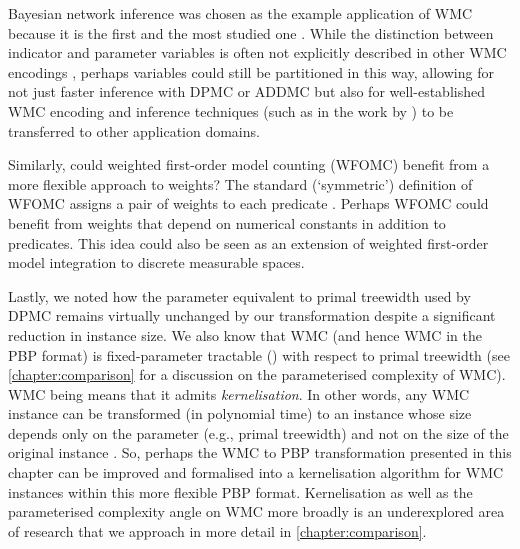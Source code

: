Bayesian network inference was chosen as the example application of WMC because
it is the first and the most studied one
\citep{DBLP:conf/ecai/BartKLM16,DBLP:conf/ijcai/ChaviraD05,DBLP:conf/sat/ChaviraD06,DBLP:conf/kr/Darwiche02,DBLP:conf/aaai/SangBK05}.
While the distinction between indicator and parameter variables is often not
explicitly described in other WMC encodings
\citep{DBLP:journals/tplp/FierensBRSGTJR15,DBLP:journals/pacmpl/HoltzenBM20,DBLP:conf/icml/XuZFLB18},
perhaps variables could still be partitioned in this way, allowing for not just
faster inference with \textsc{DPMC} or \textsc{ADDMC} but also for
well-established WMC encoding and inference techniques (such as in the work by
\citet{DBLP:conf/ijcai/ChaviraD05,DBLP:conf/sat/ChaviraD06}) to be transferred
to other application domains.

Similarly, could weighted first-order model counting (WFOMC) benefit from a more
flexible approach to weights? The standard (`symmetric') definition of WFOMC
assigns a pair of weights to each predicate
\citep{DBLP:conf/ijcai/BroeckTMDR11}. Perhaps WFOMC could benefit from weights
that depend on numerical constants in addition to predicates. This idea could
also be seen as an extension of weighted first-order model integration
\citep{DBLP:conf/uai/FeldsteinB21} to discrete measurable spaces.

Lastly, we noted how the parameter equivalent to primal treewidth used by
\textsc{DPMC} \citep{DBLP:conf/cp/DudekPV20} remains virtually unchanged by our
transformation despite a significant reduction in instance size. We also know
that WMC (and hence WMC in the PBP format) is fixed-parameter tractable (\FPT{})
with respect to primal treewidth (see \cref{chapter:comparison} for a discussion
on the parameterised complexity of WMC). WMC being \FPT{} means that it admits
\emph{kernelisation}. In other words, any WMC instance can be transformed (in
polynomial time) to an instance whose size depends only on the parameter (e.g.,
primal treewidth) and not on the size of the original instance
\citep{DBLP:series/txcs/DowneyF13}. So, perhaps the WMC to PBP transformation
presented in this chapter can be improved and formalised into a kernelisation
algorithm for WMC instances within this more flexible PBP format. Kernelisation
as well as the parameterised complexity angle on WMC more broadly is an
underexplored area of research that we approach in more detail in
\cref{chapter:comparison}.

